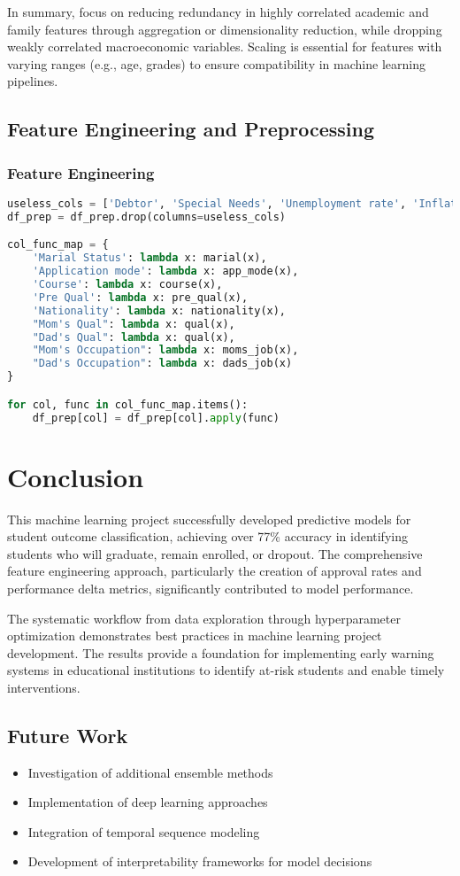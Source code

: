 \documentclass[twoside,final]{hcmut-report}
\begin{document}
In summary, focus on reducing redundancy in highly correlated academic and family features through aggregation or dimensionality reduction, while dropping weakly correlated macroeconomic variables. Scaling is essential for features with varying ranges (e.g., age, grades) to ensure compatibility in machine learning pipelines.

\subsection{Feature Engineering and Preprocessing}

\subsubsection{Feature Engineering}

\begin{lstlisting}[language=python]
useless_cols = ['Debtor', 'Special Needs', 'Unemployment rate', 'Inflation rate', 'GDP']
df_prep = df_prep.drop(columns=useless_cols)

col_func_map = {
    'Marial Status': lambda x: marial(x),
    'Application mode': lambda x: app_mode(x),
    'Course': lambda x: course(x),
    'Pre Qual': lambda x: pre_qual(x),
    'Nationality': lambda x: nationality(x),
    "Mom's Qual": lambda x: qual(x),
    "Dad's Qual": lambda x: qual(x),
    "Mom's Occupation": lambda x: moms_job(x),
    "Dad's Occupation": lambda x: dads_job(x)
}

for col, func in col_func_map.items():
    df_prep[col] = df_prep[col].apply(func)
\end{lstlisting}

\newpage\section{Conclusion}

This machine learning project successfully developed predictive models for student outcome classification, achieving over 77\% accuracy in identifying students who will graduate, remain enrolled, or dropout. The comprehensive feature engineering approach, particularly the creation of approval rates and performance delta metrics, significantly contributed to model performance.

The systematic workflow from data exploration through hyperparameter optimization demonstrates best practices in machine learning project development. The results provide a foundation for implementing early warning systems in educational institutions to identify at-risk students and enable timely interventions.

\subsection{Future Work}

\begin{itemize}
  \item Investigation of additional ensemble methods
  \item Implementation of deep learning approaches
  \item Integration of temporal sequence modeling
  \item Development of interpretability frameworks for model decisions
\end{itemize}
\end{document}
